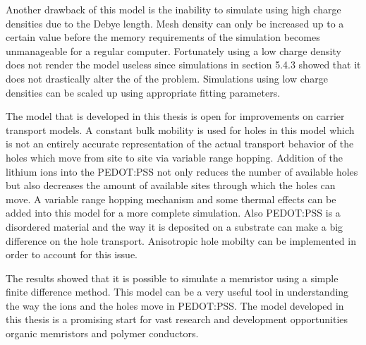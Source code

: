 \begin{doublespace}
Another drawback of this model is the inability to simulate using high charge densities due to the Debye length. Mesh density can only be increased up to a certain value before the memory requirements of the simulation becomes unmanageable for a regular computer. Fortunately using a low charge density does not render the model useless since simulations in section 5.4.3 showed that it does not drastically alter the  of the problem. Simulations using low charge densities can be scaled up using appropriate fitting parameters.  
 
The model that is developed in this thesis is open for improvements on carrier transport models. A constant bulk mobility is used for holes in this model which is not an entirely accurate representation of the actual transport behavior of the holes which move from site to site via variable range hopping. Addition of the lithium ions into the PEDOT:PSS not only reduces the number of available holes but also decreases the amount of available sites through which the holes can move. A variable range hopping mechanism and some thermal effects can be added into this model for a more complete simulation. Also PEDOT:PSS is a disordered material and the way it is deposited on a substrate can make a big difference on the hole transport. Anisotropic hole mobilty can be implemented in order to account for this issue.

The results showed that it is possible to simulate a memristor using a simple finite difference method. This model can be a very useful tool in understanding the way the ions and the holes move in PEDOT:PSS. The model developed in this thesis is a promising start for  vast research and development opportunities  organic memristors and  polymer conductors.

\end{doublespace}

